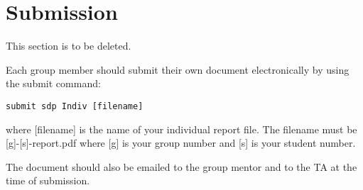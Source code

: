 \documentclass{article}
\begin{document}
\section*{Submission}
This section is to be deleted.

Each group member should submit their own document electronically by using the submit command:
\begin{verbatim}
submit sdp Indiv [filename] 
\end{verbatim}
where [filename] is the name of your individual report file. The filename must be [g]-[s]-report.pdf where [g] is your group number and  [s] is your student number.

The document should also be emailed to the group mentor and to the TA at the time of submission.




\end{document}
